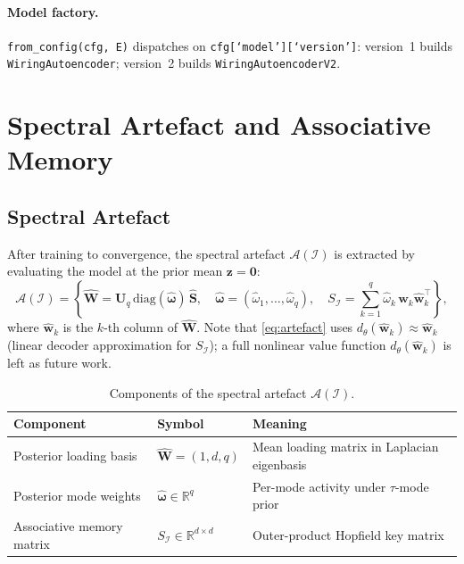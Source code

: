 \documentclass[11pt,a4paper]{article}
\newcommand{\R}{\mathbb{R}}
\newcommand{\I}{\mathcal{I}}
\newcommand{\A}{\mathcal{A}}
\newcommand{\diag}{\mathrm{diag}}
\newcommand{\bU}{\bm{U}}
\newcommand{\bS}{\bm{S}}
\newcommand{\bW}{\bm{W}}
\newcommand{\bz}{\bm{z}}
\newcommand{\bomega}{\bm{\omega}}
\begin{document}
\paragraph{Model factory.}
\texttt{from\_config(cfg, E)} dispatches on \texttt{cfg[`model'][`version']}:
version~1 builds \texttt{WiringAutoencoder}; version~2 builds
\texttt{WiringAutoencoderV2}.

\section{Spectral Artefact and Associative Memory}
\label{sec:memory}

\subsection{Spectral Artefact}

After training to convergence, the spectral artefact $\A(\I)$ is extracted
by evaluating the model at the prior mean $\bz=\mathbf{0}$:
\begin{equation}
  \A(\I) = \left\{
    \hat{\bW} = \bU_q\,\diag(\hat{\bomega})\,\hat{\bS},
    \quad
    \hat{\bomega} = (\hat{\omega}_1,\dots,\hat{\omega}_q),
    \quad
    S_{\I} = \sum_{k=1}^q \hat{\omega}_k\,\hat{\bm{w}}_k\hat{\bm{w}}_k^\top
  \right\},
  \label{eq:artefact}
\end{equation}
where $\hat{\bm{w}}_k$ is the $k$-th column of $\hat{\bW}$.
Note that \eqref{eq:artefact} uses $d_{\theta}(\hat{\bm{w}}_k)\approx\hat{\bm{w}}_k$
(linear decoder approximation for $S_{\I}$); a full nonlinear value function
$d_{\theta}(\hat{\bm{w}}_k)$ is left as future work.

\begin{table}[h]
\centering
\caption{Components of the spectral artefact $\A(\I)$.}
\label{tab:artefact}
\begin{tabular}{@{}lll@{}}
\toprule
Component & Symbol & Meaning \\
\midrule
Posterior loading basis & $\hat{\bW}=(1,d,q)$ & Mean loading matrix in Laplacian eigenbasis \\
Posterior mode weights & $\hat{\bomega}\in\R^q$ & Per-mode activity under $\tau$-mode prior \\
Associative memory matrix & $S_{\I}\in\R^{d\times d}$ & Outer-product Hopfield key matrix \\
\bottomrule
\end{tabular}
\end{table}
\end{document}

